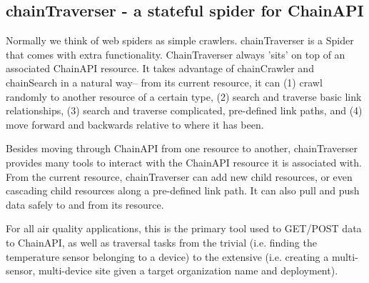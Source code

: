 \subsection{chainTraverser - a stateful spider for ChainAPI}

Normally we think of web spiders as simple crawlers.  chainTraverser is a Spider that comes with extra functionality.  ChainTraverser always 'sits' on top of an associated ChainAPI resource.  It takes advantage of chainCrawler and chainSearch in a natural way-- from its current resource, it can (1) crawl randomly to another resource of a certain type, (2) search and traverse basic link relationships, (3) search and traverse complicated, pre-defined link paths, and (4) move forward and backwards relative to where it has been. 

Besides moving through ChainAPI from one resource to another, chainTraverser provides many tools to interact with the ChainAPI resource it is associated with.  From the current resource, chainTraverser can add new child resources, or even cascading child resources along a pre-defined link path.  It can also pull and push data safely to and from its resource.

For all air quality applications, this is the primary tool used to GET/POST data to ChainAPI, as well as traversal tasks from the trivial (i.e. finding the temperature sensor belonging to a device) to the extensive (i.e. creating a multi-sensor, multi-device site given a target organization name and deployment).


